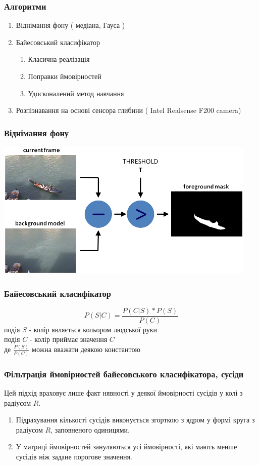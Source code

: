 \begin{frame}
	\manimate
	\frametitle{Алгоритми}
	\begin{enumerate}
		\item Віднімання фону ( медіана, Гауса )
		\item Байесовський класифікатор
		\begin{enumerate} 
			\item Класична реалізація
			\item Поправки ймовірностей
			\item Удосконалений метод навчання
		\end{enumerate}
		\item Розпізнавання на основі сенсора глибини ( Intel Realsense F200 camera)
	\end{enumerate}
	
\end{frame}

\begin{frame}
	\manimate
	\frametitle{Віднімання фону}
	\includegraphics[width=1.0\linewidth]{im/background_substraction}
\end{frame}

\begin{frame}
	\manimate
	\frametitle{Байесовський класифікатор}
	\begin{equation}
		P(S|C) = \frac{P(C|S) * P(S)}{P(C)}
	\end{equation}
	подія $S$ - колір являється кольором людської руки \\
	подія $C$ - колір приймає значення $C$ \\
	де $\frac{P(S)}{P(C)}$ можна вважати деякою константою
\end{frame}

\begin{frame}
	\manimate
	\frametitle{Фільтрація ймовірностей байесовського класифікатора, сусіди}
	Цей підхід враховує лише факт нявності у деякої ймовірності сусідів у колі з радіусом $R$.
	\begin{enumerate}
		\item Підрахування кількості сусідів виконується згорткою з ядром у формі круга з радіусом $R$, заповненого одиницями.
		\item У матриці ймовірностей зануляються усі ймовірності, які мають менше сусідів ніж задане порогове значення.
	\end{enumerate}

\end{frame}

